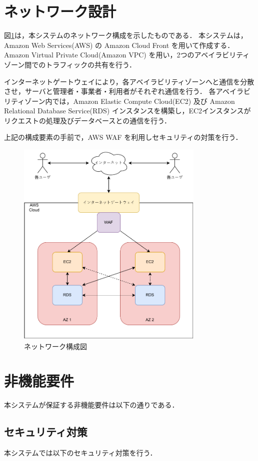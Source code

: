 \documentclass[a4paper, titlepage]{jsarticle}
\begin{document}
\section{ネットワーク設計}
図\ref{fig:network}は，本システムのネットワーク構成を示したものである．
本システムは，Amazon Web Services(AWS) の Amazon Cloud Front を用いて作成する．
Amazon Virtual Private Cloud(Amazon VPC) を用い，2つのアベイラビリティゾーン間でのトラフィックの共有を行う．

インターネットゲートウェイにより，各アベイラビリティゾーンへと通信を分散させ，サーバと管理者・事業者・利用者がそれぞれ通信を行う．
各アベイラビリティゾーン内では，Amazon Elastic Compute Cloud(EC2) 及び Amazon Relational Database Service(RDS) インスタンスを構築し，EC2インスタンスがリクエストの処理及びデータベースとの通信を行う．

上記の構成要素の手前で，AWS WAF を利用しセキュリティの対策を行う．

\begin{figure}[H]
  \includegraphics[width=0.8\textwidth]{./other/network_img.pdf}
  \caption{ネットワーク構成図}
  \label{fig:network}
\end{figure}

\section{非機能要件}
本システムが保証する非機能要件は以下の通りである．
\subsection{セキュリティ対策}
本システムでは以下のセキュリティ対策を行う．
\end{document}
